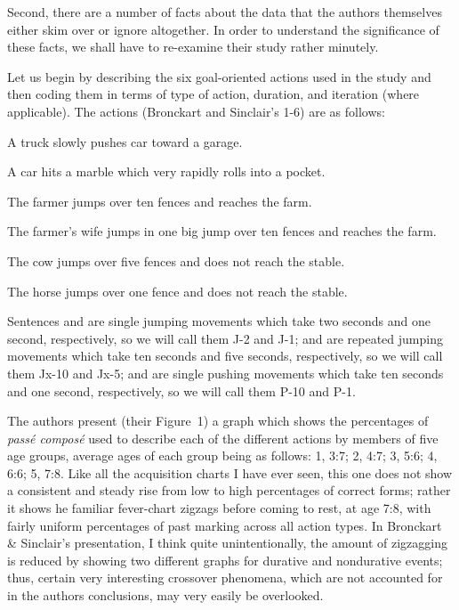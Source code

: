 Second, there are a number of facts about the \citeauthor{BrockartEtAl1973} data that the authors themselves either skim over or ignore altogether. In order to understand the significance of these facts, we shall have to re-examine their study rather minutely.

Let us begin by describing the six goal-oriented actions used in the study and then coding them in terms of type of action, duration, and iteration (where applicable). The actions (Bronckart and Sinclair's 1-6) are as follows:

\ea\label{ex:3:16}
 A truck slowly pushes car toward a garage.
\z

\ea\label{ex:3:17}
 A car hits a marble which very rapidly rolls into a pocket.
\z

\ea\label{ex:3:18}
 The farmer jumps over ten fences and reaches the farm.
\z

\ea\label{ex:3:19}
 The farmer's wife jumps in one big jump over ten fences and reaches the farm.
\z

\ea\label{ex:3:20}
 The cow jumps over five fences and does not reach the stable.
\z

\ea\label{ex:3:21}
 The horse jumps over one fence and does not reach the stable.
\z




Sentences  and  are single jumping movements which take two seconds and one second, respectively, so we will call them J-2 and J-1;  and  are repeated jumping movements which take ten seconds and five seconds, respectively, so we will call them Jx-10 and Jx-5;  and  are single pushing movements which take ten seconds and one second, respectively, so we will call them P-10 and P-1.

The authors present (their Figure~1) a graph which shows the percentages of \textit{pass\'e compos\'e} used to describe each of the different actions by members of five age groups, average ages of each group being as follows: 1, 3:7; 2, 4:7; 3, 5:6; 4, 6:6; 5, 7:8. Like all the acquisition charts I have ever seen, this one does not show a consistent and steady rise from low to high percentages of correct forms; rather it shows he familiar fever-chart zigzags before coming to rest, at age 7:8, with fairly uniform percentages of past marking across all action types. In Bronckart \& Sinclair's presentation, I think quite unintentionally, the amount of zigzagging is reduced by showing two different graphs for durative and nondurative events; thus, certain very interesting crossover phenomena, which are not accounted for in the authors conclusions, may very easily be overlooked.

